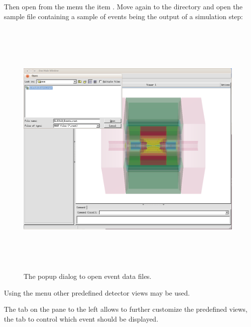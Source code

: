 \documentclass[10pt,a4paper]{article}
\begin{document}
\newpage
\noindent
Then open from the  menu the item . Move again to the 
directory  and open the sample file
 containing a sample of events being the output of 
a \DDG simulation step:

\begin{figure}[h]
  \begin{center}
    \includegraphics[height=130mm] {DDEve_4}
    \caption{The popup dialog to open event data files.}
    \label{fig:DDEve_4}
  \end{center}
\end{figure}
Using the  menu other predefined detector views may be used.

\newpage
\noindent 
The  tab on the pane to the left allows to further customize the 
predefined views, the  tab to control which event should 
be displayed.
\end{document}

